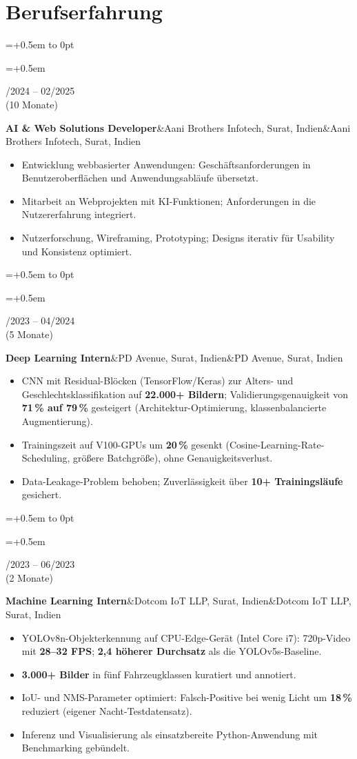 \documentclass[10pt,a4paper]{article}
\newlength{\leftcol}\setlength{\leftcol}{2.45cm}
\newcommand{\gap}{0.5em}
\newcommand{\sep}{\hspace{0.45em}\textbar\hspace{0.45em}}
\newcommand{\entry}[3]{%
  \begingroup\raggedright\leftskip=\dimexpr\leftcol+\gap\relax\noindent
  \hspace*{-\dimexpr\leftcol+\gap\relax}%
  \vtop to 0pt{\hsize=\dimexpr\leftcol+\gap\relax\raggedright\small\color{mid}\noindent #1\par\vss}%
  #2\par #3\par\endgroup\vspace{4pt}}
\newcommand{\etitle}[2]{\textbf{#1}\ifx&#2&\else\textcolor{mid}{\sep}#2\fi}
\begin{document}
\section*{Berufserfahrung}
\entry{05/2024 -- 02/2025\\(10 Monate)}
  {\etitle{AI \& Web Solutions Developer}{Aani Brothers Infotech, Surat, Indien}}
  {\begin{itemize}
    \item Entwicklung webbasierter Anwendungen: Geschäftsanforderungen in Benutzeroberflächen und Anwendungsabläufe übersetzt.
    \item Mitarbeit an Webprojekten mit KI-Funktionen; Anforderungen in die Nutzererfahrung integriert.
    \item Nutzerforschung, Wireframing, Prototyping; Designs iterativ für Usability und Konsistenz optimiert.
  \end{itemize}}
\entry{12/2023 -- 04/2024\\(5 Monate)}
  {\etitle{Deep Learning Intern}{PD Avenue, Surat, Indien}}
  {\begin{itemize}
    \item CNN mit Residual-Blöcken (TensorFlow/Keras) zur Alters- und Geschlechtsklassifikation auf \textbf{22.000+ Bildern}; Validierungsgenauigkeit von \textbf{71\,\% auf 79\,\%} gesteigert (Architektur-Optimierung, klassenbalancierte Augmentierung).
    \item Trainingszeit auf V100-GPUs um \textbf{20\,\%} gesenkt (Cosine-Learning-Rate-Scheduling, größere Batchgröße), ohne Genauigkeitsverlust.
    \item Data-Leakage-Problem behoben; Zuverlässigkeit über \textbf{10+ Trainingsläufe} gesichert.
  \end{itemize}}
\entry{05/2023 -- 06/2023\\(2 Monate)}
  {\etitle{Machine Learning Intern}{Dotcom IoT LLP, Surat, Indien}}
  {\begin{itemize}
    \item YOLOv8n-Objekterkennung auf CPU-Edge-Gerät (Intel Core i7): 720p-Video mit \textbf{28--32 FPS}; \textbf{2,4\texttimes{} höherer Durchsatz} als die YOLOv5s-Baseline.
    \item \textbf{3.000+ Bilder} in fünf Fahrzeugklassen kuratiert und annotiert.
    \item IoU- und NMS-Parameter optimiert: Falsch-Positive bei wenig Licht um \textbf{18\,\%} reduziert (eigener Nacht-Testdatensatz).
    \item Inferenz und Visualisierung als einsatzbereite Python-Anwendung mit Benchmarking gebündelt.
  \end{itemize}}
\end{document}
